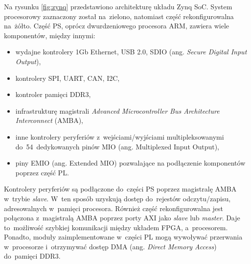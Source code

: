 Na rysunku \ref{fig:zynq} przedstawiono architekturę układu Zynq SoC. 
System procesorowy zaznaczony został na~zielono, natomiast część rekonfigurowalna na~żółto. 
Część PS, oprócz dwurdzeniowego procesora ARM, zawiera wiele komponentów, między innymi:
\begin{itemize}
	\item wydajne kontrolery 1Gb Ethernet, USB 2.0, SDIO (ang. \textit{Secure Digital Input Output}),
	\item kontrolery SPI, UART, CAN, I2C,
	\item kontroler pamięci DDR3,
	\item infrastrukturę magistrali \textit{Advanced Microcontroller Bus Architecture Interconnect} (AMBA),
	\item inne kontrolery peryferiów z~wejściami/wyjściami multipleksowanymi do~54~dedykowanych pinów MIO (ang. Multiplexed Input Output),
	\item piny EMIO (ang. Extended MIO) pozwalające na podłączenie komponentów poprzez część PL.
\end{itemize}

Kontrolery peryferiów są podłączone do~części PS poprzez magistralę AMBA w~trybie \textit{slave}. 
W~ten sposób uzyskują dostęp do~rejestów odczytu/zapisu, adresowalnych w~pamięci procesora. 
Również część rekonfigurowalna jest połączona z~magistralą AMBA poprzez porty AXI jako \textit{slave} lub \textit{master}. 
Daje to~możliwość szybkiej komunikacji między układem FPGA, a~procesorem. 
Ponadto, moduły zaimplementowane w~części PL mogą wywoływać przerwania w~procesorze i~otrzymywać dostęp DMA (ang. \textit{Direct Memory Access}) do~pamięci DDR3.

